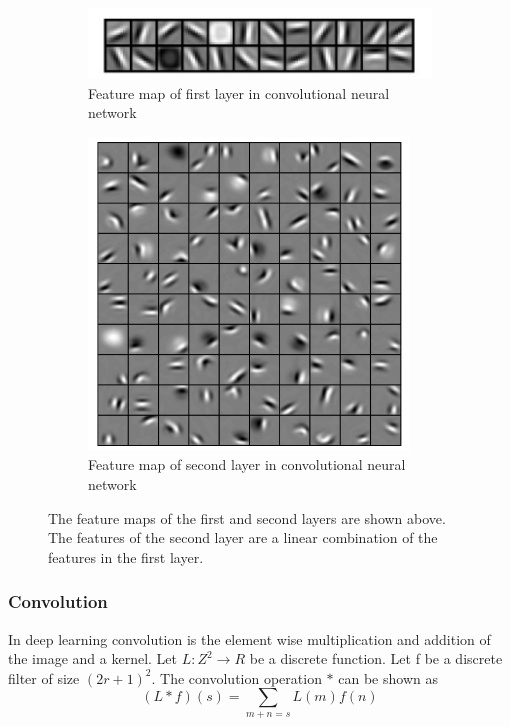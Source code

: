 \begin{figure}
\centering
\begin{subfigure}{.5\textwidth}
  \centering
  \includegraphics[width=.6\linewidth]{first_layer_features.png}
  \caption{Feature map of first layer in convolutional neural network}
  \label{fig:first_feature}
\end{subfigure}%
\begin{subfigure}{.5\textwidth}
  \centering
  \includegraphics[width=.6\linewidth]{Second_layer_features.png}
  \caption{Feature map of second layer in convolutional neural network}
  \label{fig:second_feature}
\end{subfigure}
\caption{The feature maps of the first and second layers are shown above. The features of the second layer are a linear combination of the features in the first layer. }
\label{fig:feature_map}
\end{figure}
    
\subsubsection{Convolution}
    In deep learning convolution is the element wise multiplication and addition of the image and a kernel. 
    Let $L:Z^2 \rightarrow R $ be a discrete function. 
    Let f be a discrete filter of size $(2r+1)^2 $. 
    The convolution operation $*$ can be shown as
\begin{equation}
 (L * f)(s) = \sum_{m+n=s} L(m)f(n)\label{eq:convolution}
\end{equation}
    
